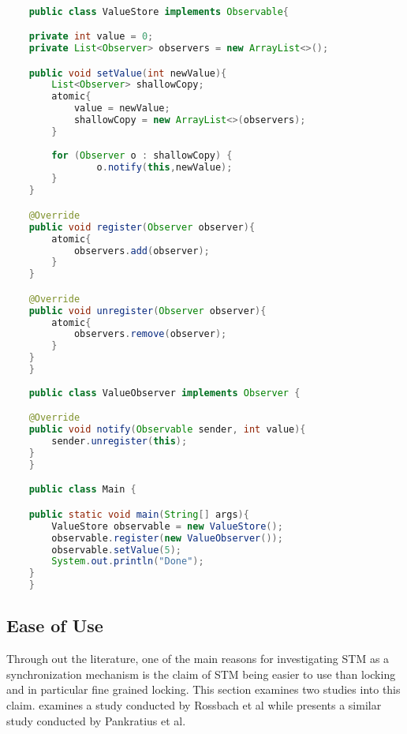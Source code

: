 \begin{lstlisting}[label=lst:observer_transactions,
  caption={Observer pattern with transactions},
  language=Java,  
  showspaces=false,
  showtabs=false,
  breaklines=true,
  showstringspaces=false,
  breakatwhitespace=true,
  commentstyle=\color{greencomments},
  keywordstyle=\color{bluekeywords},
  stringstyle=\color{redstrings},
  morekeywords={atomic, retry, orElse, var}]  % Start your code-block

	public class ValueStore implements Observable{

    private int value = 0;
    private List<Observer> observers = new ArrayList<>();

    public void setValue(int newValue){
		List<Observer> shallowCopy;        
        atomic{
            value = newValue;
            shallowCopy = new ArrayList<>(observers); 
        }
        
        for (Observer o : shallowCopy) {
                o.notify(this,newValue);
        }
    }

    @Override
    public void register(Observer observer){
        atomic{
            observers.add(observer);
        }
    }

    @Override
    public void unregister(Observer observer){
        atomic{
            observers.remove(observer);
        }
    }
	}
	
	public class ValueObserver implements Observer {

    @Override
    public void notify(Observable sender, int value){
        sender.unregister(this);
    }
	}

	public class Main {

    public static void main(String[] args){
        ValueStore observable = new ValueStore();
        observable.register(new ValueObserver());
        observable.setValue(5);
        System.out.println("Done");
    }
	}
\end{lstlisting}
\subsection{Ease of Use}
\label{sec:stm_ease_of_use}
Through out the literature, one of the main reasons for investigating \ac{STM} as a synchronization mechanism is the claim of \ac{STM} being easier to use than locking and in particular fine grained locking. This section examines two studies into this claim.  examines a study conducted by Rossbach et al while  presents a similar study conducted by Pankratius et al.
